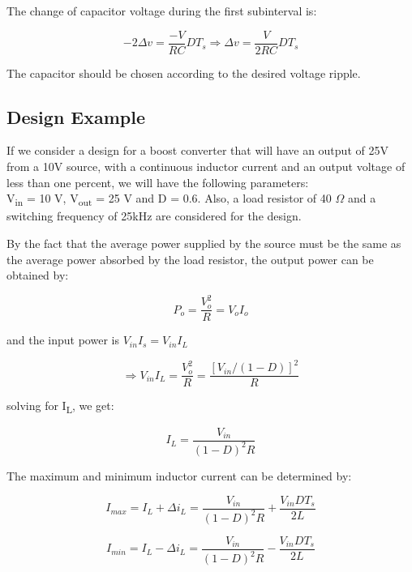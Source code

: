 The change of capacitor voltage during the first subinterval is:

\begin{equation}
	-2\Delta v = \frac{-V}{RC}DT_s \Rightarrow
  \Delta v = \frac{V}{2RC}DT_s
	\label{eq:CBC_CVR4}
\end{equation}

The capacitor should be chosen according to the desired voltage ripple.

\subsection{Design Example}\label{sec:CBC_DE}

If we consider a design for a boost converter that will have an output of 25V from a 10V source, with a continuous inductor current and an output voltage of less than one percent, we will have the following parameters:\\
V\textsubscript{in} = 10 V, V\textsubscript{out} = 25 V and D = 0.6. Also,
a load resistor of 40 $\Omega$ and a  switching frequency of 25kHz are considered for the design.


By the fact that the average power supplied by the source must be the same as the average power absorbed by the load resistor, the output power can be obtained by:

\begin{equation}
	P_o = \frac{V^2_o}{R} = V_oI_o
	\label{eq:CBC_CVR4}
\end{equation}

and the input power is $V_{in}I_s = V_{in}I_L$

\begin{equation}
	\Rightarrow V_{in}I_L = \frac{V^2_o}{R} = \frac{[V_{in}/(1-D)]^2}{R}
	\label{eq:CBC_CVR4}
\end{equation}

solving for I\textsubscript{L}, we get:

\begin{equation}
	I_L = \frac{V_{in}}{(1-D)^2R}
	\label{eq:CBC_CVR4}
\end{equation}

The maximum and minimum inductor current can be determined by:

\begin{equation}
	I_{max} = I_L + \Delta i_L = \frac{V_{in}}{(1-D)^2R} + \frac{V_{in}DT_s}{2L}
	\label{eq:CBC_CVR4}
\end{equation}

\begin{equation}
	I_{min} = I_L - \Delta i_L = \frac{V_{in}}{(1-D)^2R} - \frac{V_{in}DT_s}{2L}
	\label{eq:CBC_CVR4}
\end{equation}


